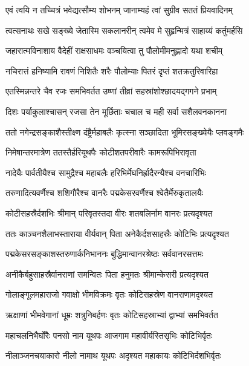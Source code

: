 \twolineshloka
{एवं त्वयि न तच्चित्रं भवेद्यत्सौम्य शोभनम्}
{जानाम्यहं त्वां सुग्रीव सततं प्रियवादिनम्} %

\twolineshloka
{त्वत्सनाथः सखे सङ्ख्ये जेतास्मि सकलानरीन्}
{त्वमेव मे सुहृन्मित्रं साहाय्यं कर्तुमर्हसि} %

\twolineshloka
{जहारात्मविनाशाय वैदेहीं राक्षसाधमः}
{वञ्चयित्वा तु पौलोमीमनुह्लादो यथा शचीम्} %

\twolineshloka
{नचिरात्तं हनिष्यामि रावणं निशितैः शरैः}
{पौलोम्याः पितरं दृप्तं शतक्रतुरिवारिहा} %

\twolineshloka
{एतस्मिन्नन्तरे चैव रजः समभिवर्तत}
{उष्णां तीव्रां सहस्रांशोश्छादयद्गगने प्रभाम्} %

\twolineshloka
{दिशः पर्याकुलाश्चासन् रजसा तेन मूर्छिताः}
{चचाल च मही सर्वा सशैलवनकानना} %

\twolineshloka
{ततो नगेन्द्रसङ्काशैस्तीक्ष्ण दंष्ट्रैर्महाबलैः}
{कृत्स्ना सञ्छादिता भूमिरसङ्ख्येयैः प्लवङ्गमैः} %

\twolineshloka
{निमेषान्तरमात्रेण ततस्तैर्हरियूथपैः}
{कोटीशतपरीवारैः कामरूपिभिरावृता} %

\twolineshloka
{नादेयैः पार्वतीयैश्च सामुद्रैश्च महाबलैः}
{हरिभिर्मेघनिर्ह्रादैरन्यैश्च वनचारिभिः} %

\twolineshloka
{तरुणादित्यवर्णैश्च शशिगौरैश्च वानरैः}
{पद्मकेसरवर्णैश्च श्वेतैर्मेरुकृतालयैः} %

\twolineshloka
{कोटीसहस्रैर्दशभिः श्रीमान् परिवृतस्तदा}
{वीरः शतबलिर्नाम वानरः प्रत्यदृश्यत} %

\twolineshloka
{ततः काञ्चनशैलाभस्ताराया वीर्यवान् पिता}
{अनेकैर्दशसाहस्रैः कोटिभिः प्रत्यदृश्यत} %

\twolineshloka
{पद्मकेसरसङ्काशस्तरुणार्कनिभाननः}
{बुद्धिमान्वानरश्रेष्ठः सर्ववानरसत्तमः} %

\twolineshloka
{अनीकैर्बहुसाहस्रैर्वानराणां समन्वितः}
{पिता हनुमतः श्रीमान्केसरी प्रत्यदृश्यत} %

\twolineshloka
{गोलाङ्गूलमहाराजो गवाक्षो भीमविक्रमः}
{वृतः कोटिसहस्रेण वानराणामदृश्यत} %

\twolineshloka
{ऋक्षाणां भीमवेगानां धूम्रः शत्रुनिबर्हणः}
{वृतः कोटिसहस्राभ्यां द्वाभ्यां समभिवर्तत} %

\twolineshloka
{महाचलनिभैर्घोरैः पनसो नाम यूथपः}
{आजगाम महावीर्यस्तिसृभिः कोटिभिर्वृतः} %

\twolineshloka
{नीलाञ्जनचयाकारो नीलो नामाथ यूथपः}
{अदृश्यत महाकायः कोटिभिर्दशभिर्वृतः} %

